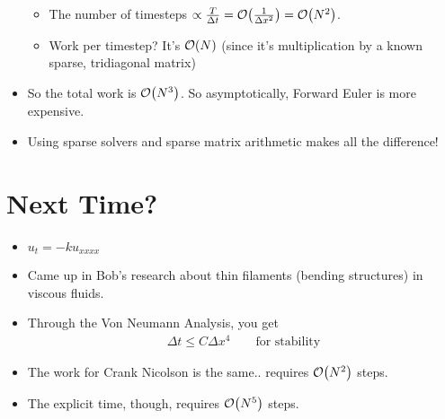 \documentclass{article}
\newcommand{\Dx}{\Delta x}
\newcommand{\Dt}{\Delta t}
\begin{document}
\begin{itemize}
            \begin{itemize}
                \item The number of timesteps $\propto \frac{T}{\Dt} = \order{\frac{1}{\Dx^2}} = \order{N^2}$.
                \item Work per timestep?  It's $\order{N}$ (since it's multiplication by a known sparse, tridiagonal matrix)
            \end{itemize}
            \item So the total work is $\order{N^3}$.  So asymptotically, Forward Euler is more expensive.
            \item Using sparse solvers and sparse matrix arithmetic makes all the difference!
        \end{itemize}

    \section{Next Time?}

        \begin{itemize}
            \item $u_t = -ku_{xxxx}$
            \item Came up in Bob's research about thin filaments (bending structures) in viscous fluids.
            \item Through the Von Neumann Analysis, you get
            \begin{align*}
                \Dt \leq C \Dx^4 \qquad \text{for stability}
            \end{align*}
            \item The work for Crank Nicolson is the same.. requires $\order{N^2}$ steps.
            \item The explicit time, though, requires $\order{N^5}$ steps.
        \end{itemize}
\end{document}
